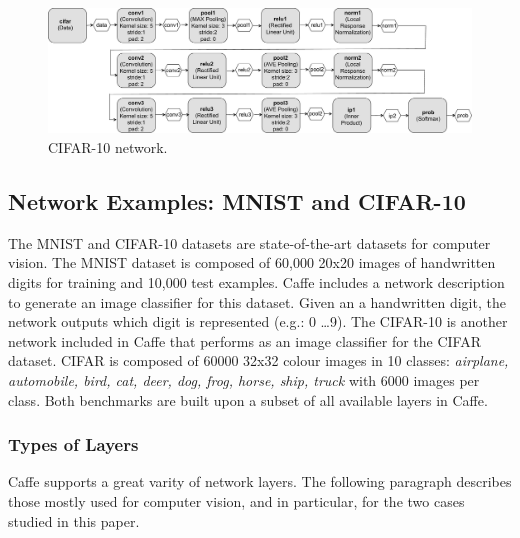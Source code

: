 \begin{figure}[]
\centering
\includegraphics[width=15cm]{figures/cifar.pdf}
\caption{CIFAR-10 network.}
\label{fig-cifar}
\end{figure}

\subsection{Network Examples: MNIST and CIFAR-10}
The MNIST and CIFAR-10 datasets are state-of-the-art datasets for 
computer vision. The MNIST dataset is composed of 60,000 20x20 images 
of handwritten digits for training and 10,000 test examples. 
Caffe includes a network description to generate an image 
classifier for this dataset. Given an a handwritten digit, 
the network outputs which digit is represented (e.g.: 0 \dots 9). 
The CIFAR-10 is another network included in Caffe 
that performs as an image classifier for the CIFAR dataset. CIFAR is 
composed of 60000 32x32 colour images in 10 classes: 
\emph{airplane, automobile, bird, cat, deer, dog, frog, horse, ship, 
truck} with 6000 images per class. Both benchmarks are built upon 
a subset of all available layers in Caffe. 

\subsubsection{Types of Layers}
Caffe supports a great varity of network layers. The following 
paragraph describes those mostly used for computer vision, and 
in particular, for the two cases studied in this paper.

